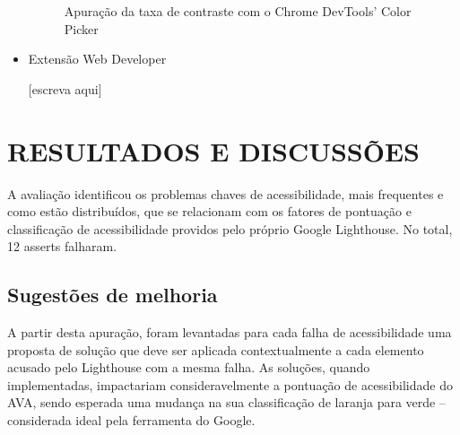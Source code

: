 \documentclass[
	12pt,				%
	openright,			%
	oneside,			%
	a4paper,			%
	chapter=TITLE,		%
	section=TITLE,		%
	subsection=TITLE,	%
	subsubsection=TITLE,%
	english,			%
	brazil				%
	]{abntex2}
\theoremstyle{definition}
\begin{document}
\begin{itemize}
\begin{figure}[!h]
\centering
\caption{Apuração da taxa de contraste com o Chrome DevTools’ Color Picker }
\label{Apuração da taxa de contraste com o Chrome DevTools’ Color Picker }
\end{figure}

    \item Extensão Web Developer
    
[escreva aqui]
    
\end{itemize}

\chapter{RESULTADOS E DISCUSSÕES}

A avaliação identificou os problemas chaves de acessibilidade, mais frequentes e como estão distribuídos, que se relacionam com os fatores de pontuação e classificação de acessibilidade providos pelo próprio Google Lighthouse. No total, 12 asserts falharam.



\section{Sugestões de melhoria}

A partir desta apuração, foram levantadas para cada falha de acessibilidade uma proposta de solução que deve ser aplicada contextualmente a cada elemento acusado pelo Lighthouse com a mesma falha. As soluções, quando implementadas, impactariam consideravelmente a pontuação de acessibilidade do AVA, sendo esperada uma mudança na sua classificação de laranja para verde – considerada ideal pela ferramenta do Google.
\end{document}
